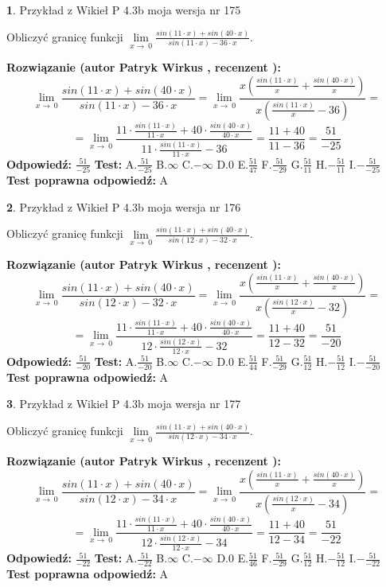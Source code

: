 \documentclass[12pt, a4paper]{article}
\theoremstyle{definition} %
\newtheorem{zad}{}
\newcommand{\zadStart}[1]{\begin{zad}#1\newline}
\newcommand{\zadStop}{\end{zad}}
\newcommand{\rozwStart}[2]{\noindent \textbf{Rozwiązanie (autor #1 , recenzent #2): }\newline}
\newcommand{\rozwStop}{\newline}
\newcommand{\odpStart}{\noindent \textbf{Odpowiedź:}\newline}
\newcommand{\odpStop}{\newline}
\newcommand{\testStart}{\noindent \textbf{Test:}\newline}
\newcommand{\testStop}{\newline}
\newcommand{\kluczStart}{\noindent \textbf{Test poprawna odpowiedź:}\newline}
\newcommand{\kluczStop}{\newline}
\begin{document}
\zadStart{Przykład z Wikieł P 4.3b moja wersja nr 175}


Obliczyć granicę funkcji $\lim\limits_{x\to\ 0}\frac{sin(11 \cdot x)+sin(40 \cdot x)}{sin(11 \cdot x)-36 \cdot x}$.
\zadStop
\rozwStart{Patryk Wirkus}{}
$$\lim\limits_{x\to\ 0}\frac{sin(11 \cdot x)+sin(40 \cdot x)}{sin(11 \cdot x)-36 \cdot x}=\lim\limits_{x\to\ 0}\frac{x(\frac{sin(11 \cdot x)}{x}+\frac{sin(40 \cdot x)}{x})}{x(\frac{sin(11 \cdot x)}{x}-36)}=$$
$$=\lim\limits_{x\to\ 0}\frac{11 \cdot \frac{sin(11 \cdot x)}{11 \cdot x}+40 \cdot \frac{sin(40 \cdot x)}{40 \cdot x}}{11 \cdot \frac{sin(11 \cdot x)}{11 \cdot x}-36}=\frac{11+40}{11-36} = \frac{51}{-25}$$
\rozwStop
\odpStart
$\frac{51}{-25}$
\odpStop
\testStart
A.$\frac{51}{-25}$
B.$\infty$
C.$-\infty$
D.$0$
E.$\frac{51}{47}$
F.$\frac{51}{-29}$
G.$\frac{51}{11}$
H.$-\frac{51}{11}$
I.$-\frac{51}{-25}$
\testStop
\kluczStart
A
\kluczStop



\zadStart{Przykład z Wikieł P 4.3b moja wersja nr 176}


Obliczyć granicę funkcji $\lim\limits_{x\to\ 0}\frac{sin(11 \cdot x)+sin(40 \cdot x)}{sin(12 \cdot x)-32 \cdot x}$.
\zadStop
\rozwStart{Patryk Wirkus}{}
$$\lim\limits_{x\to\ 0}\frac{sin(11 \cdot x)+sin(40 \cdot x)}{sin(12 \cdot x)-32 \cdot x}=\lim\limits_{x\to\ 0}\frac{x(\frac{sin(11 \cdot x)}{x}+\frac{sin(40 \cdot x)}{x})}{x(\frac{sin(12 \cdot x)}{x}-32)}=$$
$$=\lim\limits_{x\to\ 0}\frac{11 \cdot \frac{sin(11 \cdot x)}{11 \cdot x}+40 \cdot \frac{sin(40 \cdot x)}{40 \cdot x}}{12 \cdot \frac{sin(12 \cdot x)}{12 \cdot x}-32}=\frac{11+40}{12-32} = \frac{51}{-20}$$
\rozwStop
\odpStart
$\frac{51}{-20}$
\odpStop
\testStart
A.$\frac{51}{-20}$
B.$\infty$
C.$-\infty$
D.$0$
E.$\frac{51}{44}$
F.$\frac{51}{-29}$
G.$\frac{51}{12}$
H.$-\frac{51}{12}$
I.$-\frac{51}{-20}$
\testStop
\kluczStart
A
\kluczStop



\zadStart{Przykład z Wikieł P 4.3b moja wersja nr 177}


Obliczyć granicę funkcji $\lim\limits_{x\to\ 0}\frac{sin(11 \cdot x)+sin(40 \cdot x)}{sin(12 \cdot x)-34 \cdot x}$.
\zadStop
\rozwStart{Patryk Wirkus}{}
$$\lim\limits_{x\to\ 0}\frac{sin(11 \cdot x)+sin(40 \cdot x)}{sin(12 \cdot x)-34 \cdot x}=\lim\limits_{x\to\ 0}\frac{x(\frac{sin(11 \cdot x)}{x}+\frac{sin(40 \cdot x)}{x})}{x(\frac{sin(12 \cdot x)}{x}-34)}=$$
$$=\lim\limits_{x\to\ 0}\frac{11 \cdot \frac{sin(11 \cdot x)}{11 \cdot x}+40 \cdot \frac{sin(40 \cdot x)}{40 \cdot x}}{12 \cdot \frac{sin(12 \cdot x)}{12 \cdot x}-34}=\frac{11+40}{12-34} = \frac{51}{-22}$$
\rozwStop
\odpStart
$\frac{51}{-22}$
\odpStop
\testStart
A.$\frac{51}{-22}$
B.$\infty$
C.$-\infty$
D.$0$
E.$\frac{51}{46}$
F.$\frac{51}{-29}$
G.$\frac{51}{12}$
H.$-\frac{51}{12}$
I.$-\frac{51}{-22}$
\testStop
\kluczStart
A
\kluczStop
\end{document}
